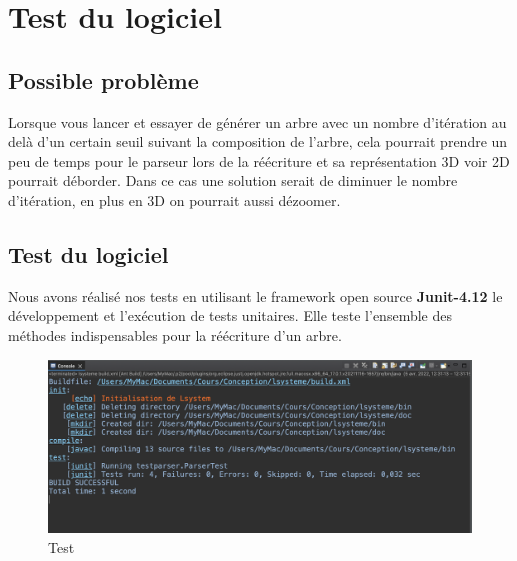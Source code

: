 \section{Test du logiciel}
\subsection{Possible problème}
	Lorsque vous lancer et essayer de générer un arbre avec un nombre d'itération au delà d'un certain seuil suivant la composition de l'arbre, cela pourrait prendre un peu de temps pour le parseur lors de la réécriture et sa représentation 3D voir 2D pourrait déborder. Dans ce cas une solution serait de diminuer le nombre d'itération, en plus en 3D on pourrait aussi dézoomer.

\subsection{Test du logiciel}
	Nous avons réalisé nos tests en utilisant le framework open source \textbf{Junit-4.12} le développement et l'exécution de tests unitaires. Elle teste l'ensemble des méthodes indispensables pour la réécriture d'un arbre.
\\ 
	\begin{figure}[h]
		\centering
		\includegraphics[width=16cm]{images/test.png}
	    \caption{Test }
	\end{figure}